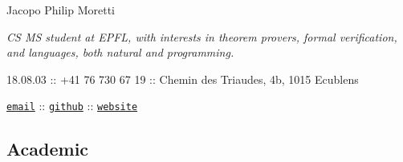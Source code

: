 \documentclass[11pt]{article}
\renewcommand{\url}[1]{{\texttt{#1}}}
\begin{document}
  \setlength{\parindent}{0em}
  \pagestyle{empty}


  \begin{center}
  \noindent\begin{minipage}{0.66\textwidth}
    \begin{center}
      \huge Jacopo Philip Moretti
    \end{center}
    \textit{CS MS student at EPFL, with interests in theorem provers, formal verification, and languages, both natural and programming.}

    18.08.03 :: +41 76 730 67 19 :: Chemin des Triaudes, 4b, 1015 Ecublens
    \begin{center}
      \href{https://people.epfl.ch/jacopo.moretti}{\url{email}} :: \href{https://github.com/quartztz}{\url{github}} :: \href{https://quartztz.github.io}{\url{website}}
    \end{center}
  \end{minipage}
  \end{center}

  \subsection*{Academic}
\end{document}
